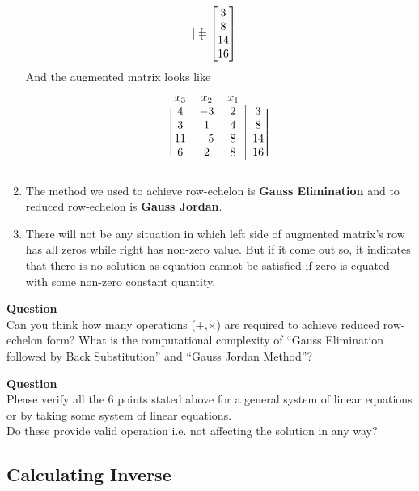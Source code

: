 \documentclass{article}
\begin{document}
\begin{enumerate}
\[\begin{bmatrix}
        \end{bmatrix} = 
            \begin{bmatrix}
                3\\8\\14\\16
            \end{bmatrix}\\
    \]
    And the augmented matrix looks like
    \[
    \begin{blockarray}{cccc}
        x_3 & x_2 & x_1 && \\
        \begin{block}{[ccc|c]}
        4 & -3 & 2 & 3 \\
        3 & 1 & 4 & 8 \\
        11 & -5 & 8 & 14\\
        6 & 2 & 8 & 16 \\
        \end{block}
        \end{blockarray}
        \]
\item The method we used to achieve row-echelon is \textbf{Gauss Elimination} and to reduced row-echelon is \textbf{Gauss Jordan}.
\item There will not be any situation in which left side of augmented matrix's row has all zeros while right has non-zero value. But if it come out so, it indicates that there is no solution as equation cannot be satisfied if zero is equated with some non-zero constant quantity.
 \end{enumerate}  
 
\textbf{Question}\\
Can you think how many operations ($+$,$\times$) are required to achieve reduced row-echelon form? What is the computational complexity of ``Gauss Elimination followed by Back Substitution'' and ``Gauss Jordan Method''? 

\textbf{Question}\\
Please verify all the 6 points stated above for a general system of linear equations or by taking some system of linear equations.\\
Do these provide valid operation i.e. not affecting the solution in any way?\\

\subsection{Calculating Inverse}
\end{document}
